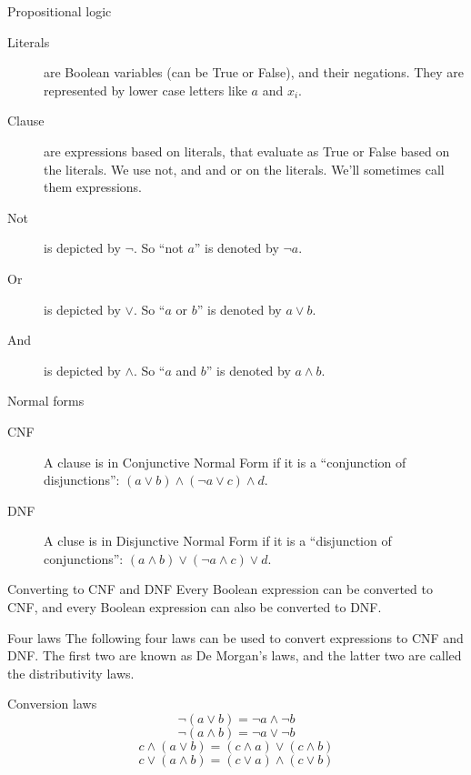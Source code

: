 \begin{frame}{Propositional logic}
  \begin{description}
    \item[Literals] are Boolean variables (can be True or False), and their negations. They are represented by lower case letters like $a$ and $x_i$.
    \vspace{0.3cm}
    \item[Clause] are expressions based on literals, that evaluate as True or False based on the literals. We use not, and and or on the literals. We'll sometimes call them expressions.
    \vspace{0.3cm}
    \item[Not] is depicted by $\neg$. So ``not $a$'' is denoted by $\neg a$.
    \vspace{0.3cm}
    \item[Or] is depicted by $\vee$. So ``$a$ or $b$'' is denoted by $a \vee b$.
    \vspace{0.3cm}
    \item[And] is depicted by $\wedge$. So ``$a$ and $b$'' is denoted by $a \wedge b$.
  \end{description}
\end{frame}


\begin{frame}{Normal forms}
  \begin{description}
    \item[CNF] A clause is in Conjunctive Normal Form if it is a ``conjunction of disjunctions'': $(a \vee b) \wedge (\neg a \vee c) \wedge d$.
    \vspace{0.5cm}
    \item[DNF] A cluse is in Disjunctive Normal Form if it is a ``disjunction of conjunctions'': $(a \wedge b) \vee (\neg a \wedge c) \vee d$.
  \end{description}
  \vspace{0.5cm}
  {\begin{block}{Converting to CNF and DNF}
    Every Boolean expression can be converted to CNF, and every Boolean expression can also be converted to DNF.
  \end{block}}
\end{frame}


\begin{frame}{Four laws}
  The following four laws can be used to convert expressions to CNF and DNF.
  The first two are known as De Morgan's laws, and the latter two are called the distributivity laws.
  \vspace{0.5cm}
  {\begin{block}{Conversion laws}
    \[ \neg ( a \vee b) = \neg a \wedge \neg b \]
    \[ \neg ( a \wedge b) = \neg a \vee \neg b \]
    \[ c \wedge ( a \vee b) = (c \wedge a) \vee (c \wedge b) \]
    \[ c \vee ( a \wedge b) = (c \vee a) \wedge (c \vee b) \]
  \end{block}}
\end{frame}


